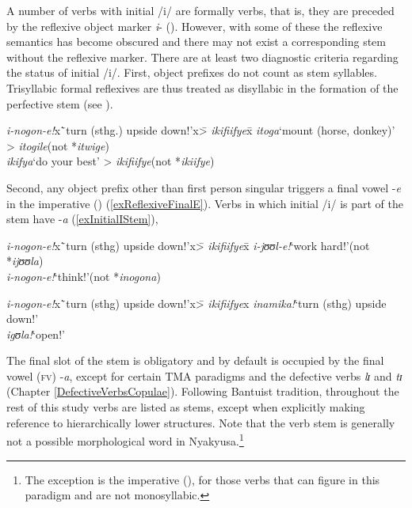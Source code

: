 A number of verbs with initial /i/ are formally  verbs, that is, they are preceded by the reflexive object marker \textit{i}- (). However, with some of these the reflexive semantics has become obscured and there may not exist a corresponding stem without the reflexive marker. There are at least two diagnostic criteria regarding the status of initial /i/. First, object prefixes do not count as stem syllables. Trisyllabic formal reflexives are thus treated as disyllabic in the formation of the perfective stem (see ).
\begin{exe}
	\ex
	\begin{tabbing}
		\textit{i-nogon-e!}x\=`turn (sthg.) upside down!'x\= > \textit{ikifiifye}x\=\kill
		\textit{itoga}\>`mount (horse, donkey)'\> > \textit{itogile}\>(not *\textit{itwige})\\
		\textit{ikifya}\>`do your best'\> > \textit{ikifiifye}\>(not *\textit{ikiifye})
	\end{tabbing}
\end{exe}

Second, any object prefix other than first person singular triggers a final vowel -\textit{e} in the imperative () (\ref{exReflexiveFinalE}). Verbs in which initial /i/ is part of the stem have -\textit{a} (\ref{exInitialIStem}),
\begin{exe}
	\ex\label{exReflexiveFinalE}
	\begin{tabbing}
		\textit{i-nogon-e!}x\=`turn (sthg) upside down!'x\= > \textit{ikifiifye}x\=\kill
		\textit{i-jʊʊl-e!}\>`work hard!'\>(not *\textit{ijʊʊla})\\
		\textit{i-nogon-e!}\>`think!'\>(not *\textit{inogona})
	\end{tabbing} 
	\ex\label{exInitialIStem}
	\begin{tabbing}
		\textit{i-nogon-e!}x\=`turn (sthg) upside down!'x\=> \textit{ikifiifye}x\kill
		\textit{inamika!}\>`turn (sthg) upside down!'\\
		\textit{igʊla!}\>`open!'
	\end{tabbing}
\end{exe}

The final slot of the stem is obligatory and by default is occupied by the final vowel (\textsc{fv}) -\textit{a}, except for certain TMA paradigms and the defective verbs \textit{lɪ} and \textit{tɪ} (Chapter \ref{DefectiveVerbsCopulae}). Following Bantuist tradition, throughout the rest of this study verbs are listed as stems, except when explicitly making reference to hierarchically lower structures. Note that the verb stem is generally not a possible morphological word in Nyakyusa.\footnote{The exception is the imperative (), for those verbs that can figure in this paradigm and are not monosyllabic.}
